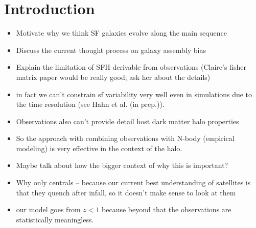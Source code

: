 \documentclass[12pt, letterpaper, preprint, tighten]{aastex}
\newcommand{\bitem}{\begin{itemize}}
\newcommand{\eitem}{\end{itemize}}
\newcommand{\hahngmm}{Hahn et al. (in prep.)}
\begin{document}
\section{Introduction}
\bitem 
\item Motivate why we think SF galaxies evolve along the main sequence  
\item Discuss the current thought process on galaxy assembly bias 
\item Explain the limitation of SFH derivable from observations (Claire's fisher matrix paper would be really good; ask her about the details) 
\item in fact we can't constrain sf variability very well even in simulations due to the time resolution (see \hahngmm).  
\item Observations also can't provide detail host dark matter halo properties
\item So the approach with combining observations with N-body (empirical modeling) is very effective in the context of the halo.
\item Maybe talk about how the bigger context of why this is important?  
\item Why only centrals -- because our current best understanding of satellites is that they quench after infall, so it doesn't make sense to look at them
\item our model goes from $z < 1$ because beyond that the observations are statistically meaningless.  
\eitem 
\end{document}
